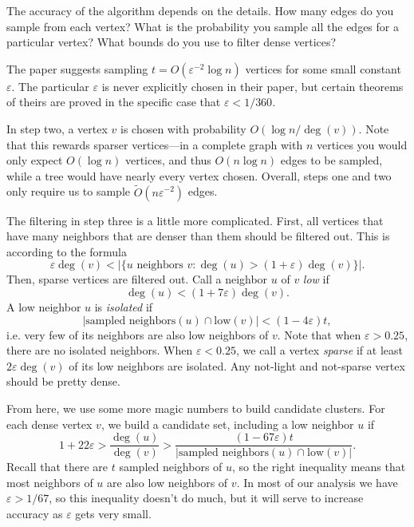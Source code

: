 \documentclass[
]{article}
\begin{document}
The accuracy of the algorithm depends on the details. How many edges do
you sample from each vertex? What is the probability you sample all the
edges for a particular vertex? What bounds do you use to filter dense
vertices?

The paper suggests sampling {\(t = O(\varepsilon^{- 2}\log n)\)}
vertices for some small constant {\(\varepsilon\)}. The particular
  {\(\varepsilon\)} is
never explicitly chosen in their paper, but certain theorems of theirs
are proved in the specific case that {\(\varepsilon < 1/360\)}.

In step two, a vertex {\(v\)} is chosen with probability
  {\(O(\log n/\deg(v))\)}. Note that this rewards sparser vertices---in a
complete graph with {\(n\)} vertices you would only expect
  {\(O(\log n)\)} vertices, and thus {\(O(n\log n)\)} edges to be sampled,
while a tree would have nearly every vertex chosen. Overall, steps one
and two only require us to sample
  {\(\tilde{O}(n\varepsilon^{- 2})\)} edges.

The filtering in step three is a little more complicated. First, all
vertices that have many neighbors that are denser than them should be filtered out. This is
according to the formula
  {\[\varepsilon\deg(v) < |\{ u\text{~neighbors~}v:\deg(u) > (1 + \varepsilon)\deg(v)\}|.\]}Then, sparse vertices are filtered out.
Call a neighbor $u$ of $v$ \emph{low} if
  {\[\deg(u) < (1 + 7\varepsilon)\deg(v).\]}A low neighbor {\(u\)} is
\emph{isolated} if
  {\[|\text{sampled\ neighbors}(u) \cap \text{low}(v)| < (1 - 4\varepsilon)t,\]}i.e.
very few of its neighbors are also low neighbors of {\(v\)}. Note that when $\varepsilon > 0.25$, there are no isolated neighbors. When $\varepsilon < 0.25$, we call a vertex \emph{sparse} if at least {\(2\varepsilon\deg(v)\)} of its low neighbors are isolated. Any not-light and not-sparse vertex should be pretty dense.

From here, we use some more magic numbers to build candidate clusters.
For each dense vertex {\(v\)}, we build a candidate set, including a low
neighbor {\(u\)} if
  {\[1 + 22\varepsilon > \frac{\deg(u)}{\deg(v)} > \frac{(1 - 67\varepsilon)t}{|\text{sampled\ neighbors}(u) \cap \text{low}(v)|}.\]}Recall
that there are {\(t\)} sampled neighbors of {\(u\)}, so the right
inequality means that most neighbors of {\(u\)} are also low neighbors
of {\(v\)}. In most of our analysis we have {\(\varepsilon > 1/67\)}, so
this inequality doesn't do much, but it will serve to
increase accuracy as {\(\varepsilon\)} gets very small.
\end{document}
